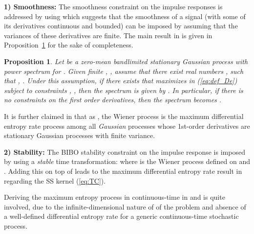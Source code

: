 \documentclass{article}
\newtheorem{prop}{Proposition}
\begin{document}
\vspace{0.2cm}
\noindent\textbf{1) Smoothness:} The smoothness constraint on the impulse responses
is addressed by using \cite[Theorem 1]{DeTL98} which suggests that the
smoothness of a signal (with some of its derivatives continuous and
bounded) can be imposed by assuming that the variances of these
derivatives are finite.
The main result in \cite[Theorem 1]{DeTL98} is given in Proposition~\ref{prop:DeNicalao} for the sake of completeness.

\begin{prop}
\label{prop:DeNicalao}\cite[Theroem 1]{DeTL98}  Let  be a
zero-mean bandlimited stationary Gaussian process with power
spectrum   for . Given finite
, , assume that there exist real
numbers ,  such that
, . Under this assumption, if
there exists  that maximizes  in (\ref{eq:def_De})
subject to constraints , , then  the spectrum is
given by . In
particular, if there is no constraints on the first  order
derivatives, then the spectrum becomes .
\end{prop}
It is further claimed in  \cite{pillonetto2011} that as , the Wiener
process is the maximum differential entropy rate process among all
\emph{Gaussian} processes whose 1st-order derivatives are stationary
Gaussian processes with finite variance.

\vspace{0.2cm}
\noindent
\textbf{2) Stability:} The BIBO stability constraint on the impulse
response  is imposed by using a \emph{stable} time
transformation:  where  is the Wiener
process defined on  and . Adding this
on top of \cite[Theorem 1]{DeTL98} leads to the maximum differential
entropy rate result in \cite[Proposition 2]{pillonetto2011}
regarding the SS kernel (\ref{eq:TC}).




Deriving the maximum entropy process in continuous-time in \cite{DeTL98} and \cite{pillonetto2011} is quite involved, due to the infinite-dimensional nature of of the problem and absence of a well-defined differential entropy rate for a generic continuous-time stochastic process.
\end{document}
